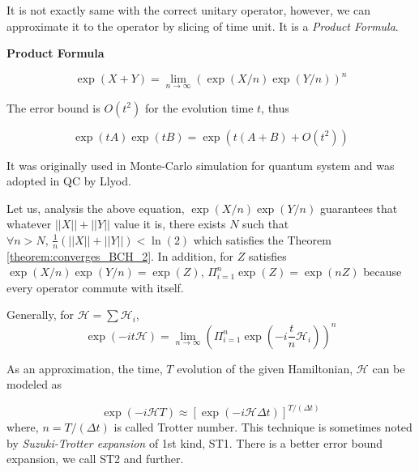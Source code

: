 It is not exactly same with the correct unitary operator, 
however, we can approximate it to the operator by slicing of time unit.
It is a \textit{Product Formula}.

\begin{theorem} \textbf{Product Formula}
    
    \begin{equation*}
        \label{eq:product_formula}
        \exp(X + Y) = \lim_{n \rightarrow \infty} \left(\exp(X/n) \exp(Y/n)\right)^{n} 
    \end{equation*}
\end{theorem} 

The error bound is $O(t^2)$ for the evolution time $t$, thus

\begin{equation}
    \exp(tA) \exp(tB) = \exp(t(A+B) + O(t^2))
\end{equation}

It was originally used in Monte-Carlo simulation for quantum system 
and was adopted in QC by Llyod\cite{lloyd_universal_1996}.

Let us, analysis the above equation, $\exp(X/n) \exp(Y/n)$ guarantees that whatever $||X||+||Y||$ value it is, there exists $N$ such that 
$\forall n >N, \, \frac{1}{n}(||X|| + ||Y||) < \ln(2)$ which satisfies the Theorem \ref{theorem:converges_BCH_2}.
In addition, for $Z$ satisfies $\exp(X/n)\exp(Y/n) = \exp(Z)$, $\Pi_{i=1}^n \exp(Z) = \exp(n Z)$ because every operator commute with itself.

Generally, for $\mathcal{H} = \sum \mathcal{H}_i$,
\begin{equation}
    \exp(- i t \mathcal{H}) = \lim_{n \rightarrow \infty} \left( \Pi_{i=1}^n \exp(-i \frac{t}{n} \mathcal{H}_i) \right)^n
\end{equation}

As an approximation, the time, $T$ evolution of the given Hamiltonian, $\mathcal{H}$ can be modeled as

\begin{equation}
    \exp(-i \mathcal{H} T) \approx [\exp(-i \mathcal{H} \Delta t)]^{T/(\Delta t)}
\end{equation}
where, $n= T/(\Delta t)$ is called Trotter number.
This technique is sometimes noted by \textit{Suzuki-Trotter expansion} of 1st kind, ST1.
There is a better error bound expansion, we call ST2 and further.

